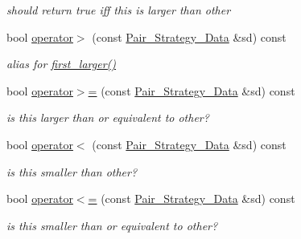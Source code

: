 \begin{Indent}
\begin{DoxyCompactItemize}
\begin{DoxyCompactList}\small\item\em should return {\ttfamily true} iff {\ttfamily this} is larger than other \end{DoxyCompactList}\item 
\mbox{\label{group__strategygroup_aed30bba9721f2497fc80393ca2d26930}} 
bool \hyperlink{group__strategygroup_aed30bba9721f2497fc80393ca2d26930}{operator$>$} (const \hyperlink{group__strategygroup_class_pair___strategy___data}{Pair\+\_\+\+Strategy\+\_\+\+Data} \&sd) const
\begin{DoxyCompactList}\small\item\em alias for \hyperlink{group__strategygroup_a272edeb1893af886b4449d7bcb799cdb}{first\+\_\+larger()} \end{DoxyCompactList}\item 
\mbox{\label{group__strategygroup_ac72e2a5cef6f9a6dafdb82f97495fd8b}} 
bool \hyperlink{group__strategygroup_ac72e2a5cef6f9a6dafdb82f97495fd8b}{operator$>$=} (const \hyperlink{group__strategygroup_class_pair___strategy___data}{Pair\+\_\+\+Strategy\+\_\+\+Data} \&sd) const
\begin{DoxyCompactList}\small\item\em is {\ttfamily this} larger than or equivalent to other? \end{DoxyCompactList}\item 
\mbox{\label{group__strategygroup_a5d5459ea25db09d848ab616c395fc209}} 
bool \hyperlink{group__strategygroup_a5d5459ea25db09d848ab616c395fc209}{operator$<$} (const \hyperlink{group__strategygroup_class_pair___strategy___data}{Pair\+\_\+\+Strategy\+\_\+\+Data} \&sd) const
\begin{DoxyCompactList}\small\item\em is {\ttfamily this} smaller than other? \end{DoxyCompactList}\item 
\mbox{\label{group__strategygroup_a19030cdc7b1f92c5941a78276e298f67}} 
bool \hyperlink{group__strategygroup_a19030cdc7b1f92c5941a78276e298f67}{operator$<$=} (const \hyperlink{group__strategygroup_class_pair___strategy___data}{Pair\+\_\+\+Strategy\+\_\+\+Data} \&sd) const
\begin{DoxyCompactList}\small\item\em is {\ttfamily this} smaller than or equivalent to other? \end{DoxyCompactList}\end{DoxyCompactItemize}
\end{Indent}

